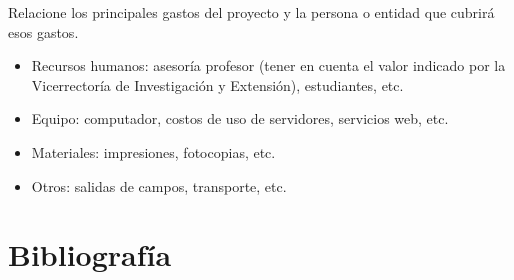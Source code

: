 \documentclass[12pt]{article}
\begin{document}
    Relacione los principales gastos del proyecto y la persona o entidad que cubrirá esos gastos.

    \begin{itemize}
        
        \item Recursos humanos:  asesoría profesor (tener en cuenta el valor indicado por la Vicerrectoría de Investigación y Extensión), estudiantes, etc.
        \item Equipo:  computador, costos de uso de servidores, servicios web, etc.
        \item Materiales:  impresiones, fotocopias, etc.
        \item Otros:  salidas de campos, transporte, etc.
        
    \end{itemize}

    \pagebreak

    \section{Bibliografía}

    \begingroup
    \renewcommand{\section}[2]{}
    \renewcommand{\addcontentsline}[3]{}
    
    \endgroup
\end{document}
